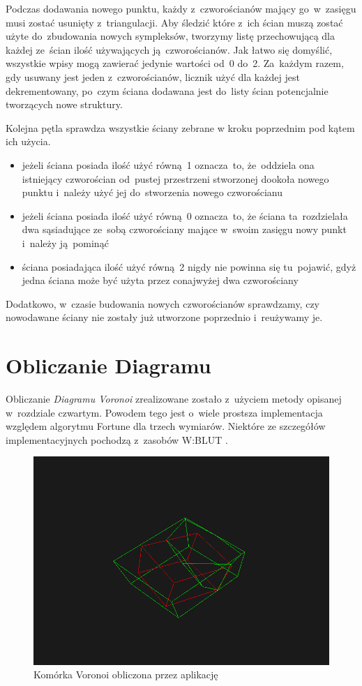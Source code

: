 \documentclass[skorowidz,autorrok,backref,xodstep,oswiadczenie]{wmimgr}
\begin{document}
Podczas dodawania nowego punktu, każdy z~czworościanów mający go~w~zasięgu musi zostać usunięty z~triangulacji. Aby śledzić które z~ich ścian muszą zostać użyte do~zbudowania nowych sympleksów, tworzymy listę przechowującą dla każdej ze~ścian ilość używających ją~czworościanów. Jak łatwo się domyślić, wszystkie wpisy mogą zawierać jedynie wartości od~0 do~2. Za~każdym razem, gdy usuwany jest jeden z~czworościanów, licznik użyć dla każdej jest dekrementowany, po~czym ściana dodawana jest do~listy ścian potencjalnie tworzących nowe struktury.

Kolejna pętla sprawdza wszystkie ściany zebrane w kroku poprzednim pod kątem ich użycia.
\begin{itemize}
\item
jeżeli ściana posiada ilość użyć równą~1 oznacza~to, że~oddziela ona istniejący czworościan od~pustej przestrzeni stworzonej dookoła nowego punktu i~należy użyć jej do~stworzenia nowego czworościanu
\item
jeżeli ściana posiada ilość użyć równą~0 oznacza~to, że ściana ta~rozdzielała dwa sąsiadujące ze~sobą czworościany mające w~swoim zasięgu nowy punkt i~należy ją~pominąć
\item
ściana posiadająca ilość użyć równą~2 nigdy nie powinna się tu~pojawić, gdyż jedna ściana może być użyta przez conajwyżej dwa czworościany
\end{itemize}

Dodatkowo, w~czasie budowania nowych czworościanów sprawdzamy, czy nowodawane ściany nie zostały już utworzone poprzednio i~reużywamy je.

\section{Obliczanie Diagramu}

Obliczanie \emph{Diagramu Voronoi} zrealizowane zostało z~użyciem metody opisanej w~rozdziale czwartym. Powodem tego jest o~wiele prostsza implementacja względem algorytmu Fortune dla trzech wymiarów. Niektóre ze szczegółów implementacyjnych pochodzą z~zasobów W:BLUT \cite{fvan}.

\begin{figure}[ht!]
\centering
\includegraphics[width=140mm]{images/app2.png}
\caption{Komórka Voronoi obliczona przez aplikację}
\label{appcell}
\end{figure}
\end{document}
